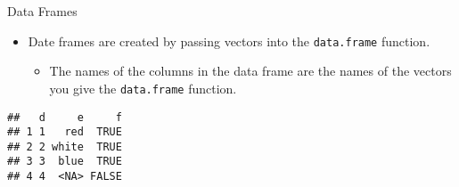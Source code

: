 \begin{frame}[fragile]{Data Frames}
\protect\hypertarget{data-frames}{}

\begin{itemize}
\tightlist
\item
  Date frames are created by passing vectors into the
  \texttt{data.frame} function.

  \begin{itemize}
  \tightlist
  \item
    The names of the columns in the data frame are the names of the
    vectors you give the \texttt{data.frame} function.
  \end{itemize}
\end{itemize}

\begin{Shaded}
\begin{Highlighting}[]
\StringTok{ }\NormalTok{(}\NormalTok{, }\NormalTok{, }\NormalTok{, }\NormalTok{)}
\StringTok{ }\NormalTok{(}\NormalTok{, }\NormalTok{, }\NormalTok{, }\NormalTok{)}
\StringTok{ }\NormalTok{(}\NormalTok{, }\NormalTok{, }\NormalTok{, }\NormalTok{)}
\StringTok{ }
\end{Highlighting}
\end{Shaded}

\begin{verbatim}
##   d     e     f
## 1 1   red  TRUE
## 2 2 white  TRUE
## 3 3  blue  TRUE
## 4 4  <NA> FALSE
\end{verbatim}

\end{frame}

